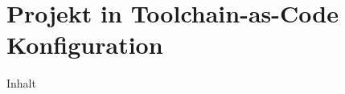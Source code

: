 \section{Projekt in Toolchain-as-Code Konfiguration}
\label{sec:06-02_project-in-toolchain-as-code-configuration}

Inhalt
